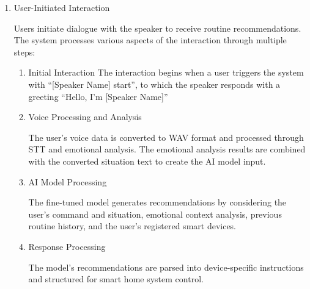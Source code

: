 \documentclass[conference]{IEEEtran}
\begin{document}
\begin{enumerate}[label=\arabic*]
    \item User-Initiated Interaction\par
    \vspace{0.3em}
    Users initiate dialogue with the speaker to receive routine recommendations. The system processes various aspects of the interaction through multiple steps:
    \vspace{0.3em}

    \begin{enumerate}[label=\arabic*)]
        \item Initial Interaction
        \vspace{0.3em}
        The interaction begins when a user triggers the system with “[Speaker Name] start”, to which the speaker responds with a greeting “Hello, I'm [Speaker Name]”

        \vspace{0.5em}

        \item Voice Processing and Analysis\par
        \vspace{0.3em}
        The user's voice data is converted to WAV format and processed through STT and emotional analysis. The emotional analysis results are combined with the converted situation text to create the AI model input.        

        \vspace{0.5em}

        \item AI Model Processing\par
        \vspace{0.3em}
        The fine-tuned model generates recommendations by considering the user's command and situation, emotional context analysis, previous routine history, and the user's registered smart devices.        

        \vspace{0.5em}

        \item Response Processing\par
        \vspace{0.3em}
        The model's recommendations are parsed into device-specific instructions and structured for smart home system control.
        
        \vspace{0.5em}


\end{enumerate}
\end{enumerate}
\end{document}
